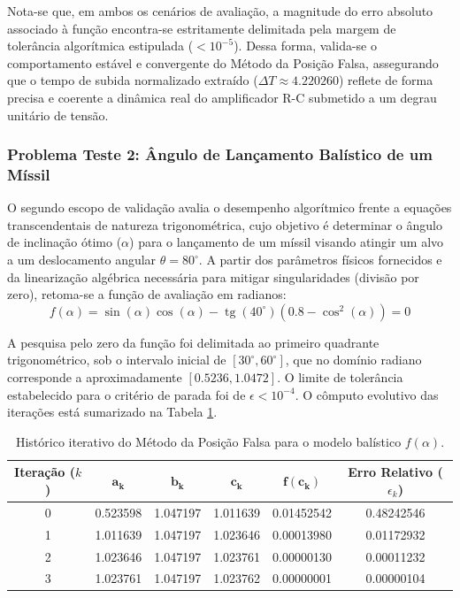 Nota-se que, em ambos os cenários de avaliação, a magnitude do erro absoluto associado à função encontra-se estritamente delimitada pela margem de tolerância algorítmica estipulada ($< 10^{-5}$). Dessa forma, valida-se o comportamento estável e convergente do Método da Posição Falsa, assegurando que o tempo de subida normalizado extraído ($\Delta T \approx 4.220260$) reflete de forma precisa e coerente a dinâmica real do amplificador R-C submetido a um degrau unitário de tensão.

\subsubsection{Problema Teste 2: Ângulo de Lançamento Balístico de um Míssil}
\label{subsubsec:problema_teste_2_posicao_falsa}

O segundo escopo de validação avalia o desempenho algorítmico frente a equações transcendentais de natureza trigonométrica, cujo objetivo é determinar o ângulo de inclinação ótimo ($\alpha$) para o lançamento de um míssil visando atingir um alvo a um deslocamento angular $\theta = 80^\circ$. A partir dos parâmetros físicos fornecidos e da linearização algébrica necessária para mitigar singularidades (divisão por zero), retoma-se a função de avaliação em radianos:
\begin{equation}
    f(\alpha) = \sin(\alpha)\cos(\alpha) - \operatorname{tg}\left(40^\circ\right)\left(0.8 - \cos^2(\alpha)\right) = 0
    \label{eq:missil_funcao_posicao_falsa}
\end{equation}

A pesquisa pelo zero da função foi delimitada ao primeiro quadrante trigonométrico, sob o intervalo inicial de $[30^\circ, 60^\circ]$, que no domínio radiano corresponde a aproximadamente $[0.5236, 1.0472]$. O limite de tolerância estabelecido para o critério de parada foi de $\epsilon < 10^{-4}$. O cômputo evolutivo das iterações está sumarizado na Tabela \ref{tab:posicao_falsa_missil}.

\begin{table}[htpb]
\centering
\caption{Histórico iterativo do Método da Posição Falsa para o modelo balístico $f(\alpha)$.}
\label{tab:posicao_falsa_missil}
\small
\begin{tabular}{@{}cccccc@{}}
\toprule
\textbf{Iteração ($k$)} & $\mathbf{a_k}$ & $\mathbf{b_k}$ & $\mathbf{c_k}$ & $\mathbf{f(c_k)}$ & \textbf{Erro Relativo} ($\epsilon_k$) \\ \midrule
0 & 0.523598 & 1.047197 & 1.011639 & \phantom{-}0.01452542 & 0.48242546 \\
1 & 1.011639 & 1.047197 & 1.023646 & \phantom{-}0.00013980 & 0.01172932 \\
2 & 1.023646 & 1.047197 & 1.023761 & \phantom{-}0.00000130 & 0.00011232 \\
3 & 1.023761 & 1.047197 & 1.023762 & \phantom{-}0.00000001 & 0.00000104 \\ \bottomrule
\end{tabular}
\end{table}

